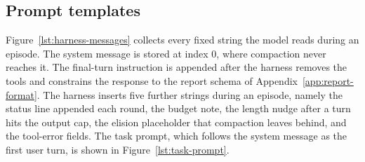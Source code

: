 \subsection{Prompt templates}
\label{app:prompts}

Figure~\ref{lst:harness-messages} collects every fixed string the model reads
during an episode. The system message is stored at index 0, where compaction
never reaches it. The final-turn instruction is appended after the harness
removes the tools and constrains the response to the report schema of
Appendix~\ref{app:report-format}. The harness inserts five further strings
during an episode, namely the status line appended each round, the budget
note, the length nudge after a turn hits the output cap, the elision
placeholder that compaction leaves behind, and the tool-error fields. The task prompt, which
follows the system message as the first user turn, is shown in
Figure~\ref{lst:task-prompt}.


